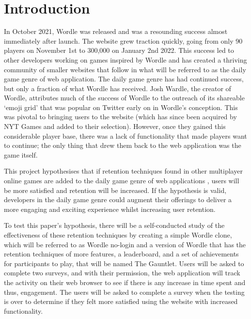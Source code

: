
\chapter{Introduction}
In October 2021, Wordle was released and was a resounding success almost immediately after launch. The website grew traction quickly, going from only 90 players on November 1st to 300,000 on January 2nd 2022.\cite{Daniel2022} This success led to other developers working on games inspired by Wordle and has created a thriving community of smaller websites \cite{Adory2023} that follow in what will be referred to as the daily game genre of web application. The daily game genre has had continued success, but only a fraction of what Wordle has received.\cite{Google2024} Josh Wardle, the creator of Wordle, attributes much of the success of Wordle to the outreach of its shareable ‘emoji grid’  that was popular on Twitter early on in Wordle's conception.\cite{Slate2022} This was pivotal to bringing users to the website (which has since been acquired by NYT Games and added to their selection).\cite{nyt2022} However, once they gained this considerable player base, there was a lack of functionality that made players want to continue; the only thing that drew them back to the web application was the game itself. 

This project hypothesises that if retention techniques found in other multiplayer online games are added to the daily game genre of web applications \cite{Katkoff2016}, users will be more satisfied and retention will be increased. If the hypothesis is valid, developers in the daily game genre could augment their offerings to deliver a more engaging and exciting experience whilst increasing user retention.

To test this paper's hypothesis, there will be a self-conducted study of the effectiveness of these retention techniques by creating a simple Wordle clone, which will be referred to as Wordle no-login and a version of Wordle that has the retention techniques of more features, a leaderboard, and a set of achievements for participants to play, that will be named The Gauntlet. Users will be asked to complete two surveys, and with their permission, the web application will track the activity on their web browser to see if there is any increase in time spent and thus, engagement. The users will be asked to complete a survey when the testing is over to determine if they felt more satisfied using the website with increased functionality.